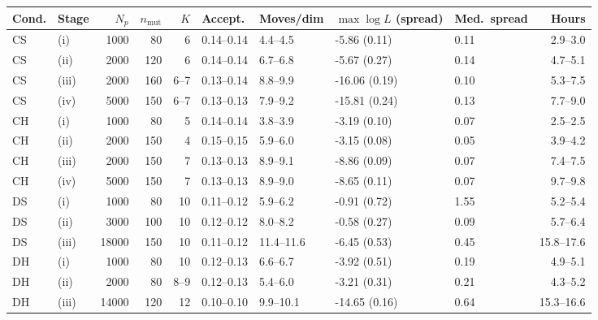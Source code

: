 \begin{tabular}{llrrrllllr}\toprule
Cond. & Stage & $N_p$ & $n_{\mathrm{mut}}$ & $K$ & Accept. & Moves/dim & $\max\log L$ (spread) & Med.\ spread & Hours\\
\midrule
CS & (i) & 1000 & 80 & 6 & 0.14--0.14 & 4.4--4.5 & -5.86 (0.11) & 0.11 & 2.9--3.0\\
CS & (ii) & 2000 & 120 & 6 & 0.14--0.14 & 6.7--6.8 & -5.67 (0.27) & 0.14 & 4.7--5.1\\
CS & (iii) & 2000 & 160 & 6--7 & 0.13--0.14 & 8.8--9.9 & -16.06 (0.19) & 0.10 & 5.3--7.5\\
CS & (iv) & 5000 & 150 & 6--7 & 0.13--0.13 & 7.9--9.2 & -15.81 (0.24) & 0.13 & 7.7--9.0\\
CH & (i) & 1000 & 80 & 5 & 0.14--0.14 & 3.8--3.9 & -3.19 (0.10) & 0.07 & 2.5--2.5\\
CH & (ii) & 2000 & 150 & 4 & 0.15--0.15 & 5.9--6.0 & -3.15 (0.08) & 0.05 & 3.9--4.2\\
CH & (iii) & 2000 & 150 & 7 & 0.13--0.13 & 8.9--9.1 & -8.86 (0.09) & 0.07 & 7.4--7.5\\
CH & (iv) & 5000 & 150 & 7 & 0.13--0.13 & 8.9--9.0 & -8.65 (0.11) & 0.07 & 9.7--9.8\\
DS & (i) & 1000 & 80 & 10 & 0.11--0.12 & 5.9--6.2 & -0.91 (0.72) & 1.55 & 5.2--5.4\\
DS & (ii) & 3000 & 100 & 10 & 0.12--0.12 & 8.0--8.2 & -0.58 (0.27) & 0.09 & 5.7--6.4\\
DS & (iii) & 18000 & 150 & 10 & 0.11--0.12 & 11.4--11.6 & -6.45 (0.53) & 0.45 & 15.8--17.6\\
DH & (i) & 1000 & 80 & 10 & 0.12--0.13 & 6.6--6.7 & -3.92 (0.51) & 0.19 & 4.9--5.1\\
DH & (ii) & 2000 & 80 & 8--9 & 0.12--0.13 & 5.4--6.0 & -3.21 (0.31) & 0.21 & 4.3--5.2\\
DH & (iii) & 14000 & 120 & 12 & 0.10--0.10 & 9.9--10.1 & -14.65 (0.16) & 0.64 & 15.3--16.6\\
\bottomrule\end{tabular}
